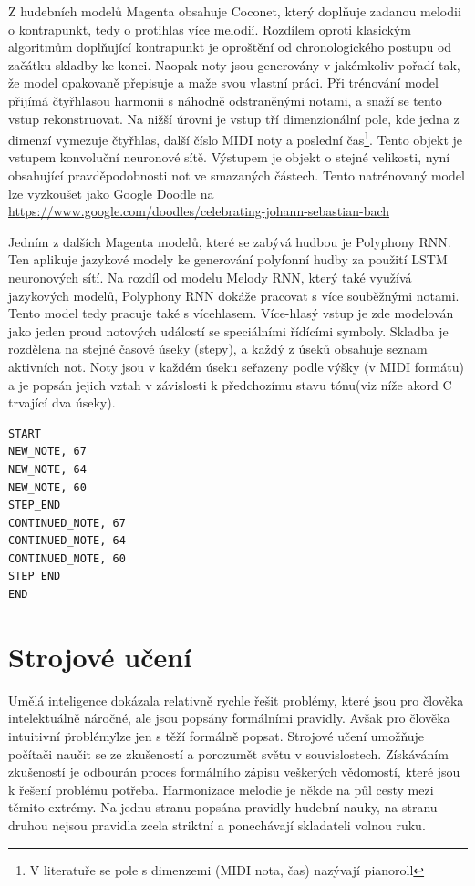 Z hudebních modelů Magenta obsahuje Coconet, 
který doplňuje zadanou melodii o kontrapunkt, 
tedy o protihlas více melodií\cite{kofron, huang2017counterpoint}.
Rozdílem oproti klasickým algoritmům doplňující kontrapunkt
je oproštění od chronologického postupu od začátku skladby ke konci.
Naopak noty jsou generovány v jakémkoliv pořadí tak, 
že model opakovaně přepisuje a maže svou vlastní práci.
Při trénování model přijímá čtyřhlasou harmonii s náhodně odstraněnými notami,
a snaží se tento vstup rekonstruovat.
Na nižší úrovni je vstup tří dimenzionální pole, 
kde jedna z dimenzí vymezuje čtyřhlas, další číslo MIDI noty a poslední čas\footnote{V literatuře se pole s dimenzemi (MIDI nota, čas) nazývají pianoroll}.
Tento objekt je vstupem konvoluční neuronové sítě.  
Výstupem je objekt o stejné velikosti, 
nyní obsahující pravděpodobnosti not ve smazaných částech.
\cite{huang2017counterpoint}
Tento natrénovaný model lze vyzkoušet jako Google Doodle na \url{https://www.google.com/doodles/celebrating-johann-sebastian-bach}
\par
Jedním z dalších Magenta modelů, které se zabývá hudbou je Polyphony RNN. 
Ten aplikuje jazykové modely ke generování polyfonní hudby za použití LSTM neuronových sítí.
Na rozdíl od modelu Melody RNN, který také využívá jazykových modelů, 
Polyphony RNN dokáže pracovat s více souběžnými notami.
Tento model tedy pracuje také s vícehlasem.
Více-hlasý vstup je zde modelován jako jeden proud notových událostí se speciálními řídícími symboly.
Skladba je rozdělena na stejné časové úseky (stepy), 
a každý z úseků obsahuje seznam aktivních not.
Noty jsou v každém úseku seřazeny podle výšky (v MIDI formátu) 
a je popsán jejich vztah v závislosti k předchozímu stavu tónu(viz níže akord C trvající dva úseky).
\cite{google_git_polyphony}
\begin{verbatim}
START
NEW_NOTE, 67
NEW_NOTE, 64
NEW_NOTE, 60
STEP_END
CONTINUED_NOTE, 67
CONTINUED_NOTE, 64
CONTINUED_NOTE, 60
STEP_END
END
\end{verbatim}


\chapter{Strojové učení}
Umělá inteligence dokázala relativně rychle řešit problémy, 
které jsou pro člověka intelektuálně náročné, 
ale jsou popsány formálními pravidly.
Avšak pro člověka intuitivní \"problémy\" lze jen s těží formálně popsat.
Strojové učení umožňuje počítači naučit se ze zkušeností
a porozumět světu v souvislostech.
Získáváním zkušeností je odbourán proces formálního zápisu veškerých vědomostí,
které jsou k řešení problému potřeba.
\cite{Goodfellow-et-al-2016}
Harmonizace melodie je někde na půl cesty mezi těmito extrémy.
Na jednu stranu popsána pravidly hudební nauky,
na stranu druhou nejsou pravidla zcela striktní 
a ponechávají skladateli volnou ruku.
\par

